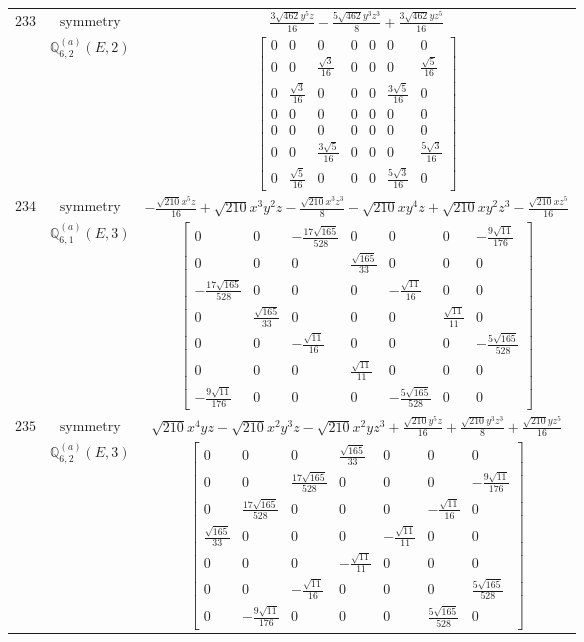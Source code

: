\documentclass[fleqn,8pt,landscape]{jsarticle}
\begin{document}
\begin{longtable}{ccc}
$ 233 $ & $ \text{symmetry} $ & $ \frac{3 \sqrt{462} y^{5} z}{16} - \frac{5 \sqrt{462} y^{3} z^{3}}{8} + \frac{3 \sqrt{462} y z^{5}}{16} $ \\
$  $ & $ \mathbb{Q}_{6,2}^{(a)}(E,2) $ & $ \begin{bmatrix} 0 & 0 & 0 & 0 & 0 & 0 & 0 \\ 0 & 0 & \frac{\sqrt{3}}{16} & 0 & 0 & 0 & \frac{\sqrt{5}}{16} \\ 0 & \frac{\sqrt{3}}{16} & 0 & 0 & 0 & \frac{3 \sqrt{5}}{16} & 0 \\ 0 & 0 & 0 & 0 & 0 & 0 & 0 \\ 0 & 0 & 0 & 0 & 0 & 0 & 0 \\ 0 & 0 & \frac{3 \sqrt{5}}{16} & 0 & 0 & 0 & \frac{5 \sqrt{3}}{16} \\ 0 & \frac{\sqrt{5}}{16} & 0 & 0 & 0 & \frac{5 \sqrt{3}}{16} & 0 \end{bmatrix} $ \\ \hline
$ 234 $ & $ \text{symmetry} $ & $ - \frac{\sqrt{210} x^{5} z}{16} + \sqrt{210} x^{3} y^{2} z - \frac{\sqrt{210} x^{3} z^{3}}{8} - \sqrt{210} x y^{4} z + \sqrt{210} x y^{2} z^{3} - \frac{\sqrt{210} x z^{5}}{16} $ \\
$  $ & $ \mathbb{Q}_{6,1}^{(a)}(E,3) $ & $ \begin{bmatrix} 0 & 0 & - \frac{17 \sqrt{165}}{528} & 0 & 0 & 0 & - \frac{9 \sqrt{11}}{176} \\ 0 & 0 & 0 & \frac{\sqrt{165}}{33} & 0 & 0 & 0 \\ - \frac{17 \sqrt{165}}{528} & 0 & 0 & 0 & - \frac{\sqrt{11}}{16} & 0 & 0 \\ 0 & \frac{\sqrt{165}}{33} & 0 & 0 & 0 & \frac{\sqrt{11}}{11} & 0 \\ 0 & 0 & - \frac{\sqrt{11}}{16} & 0 & 0 & 0 & - \frac{5 \sqrt{165}}{528} \\ 0 & 0 & 0 & \frac{\sqrt{11}}{11} & 0 & 0 & 0 \\ - \frac{9 \sqrt{11}}{176} & 0 & 0 & 0 & - \frac{5 \sqrt{165}}{528} & 0 & 0 \end{bmatrix} $ \\ \hline
$ 235 $ & $ \text{symmetry} $ & $ \sqrt{210} x^{4} y z - \sqrt{210} x^{2} y^{3} z - \sqrt{210} x^{2} y z^{3} + \frac{\sqrt{210} y^{5} z}{16} + \frac{\sqrt{210} y^{3} z^{3}}{8} + \frac{\sqrt{210} y z^{5}}{16} $ \\
$  $ & $ \mathbb{Q}_{6,2}^{(a)}(E,3) $ & $ \begin{bmatrix} 0 & 0 & 0 & \frac{\sqrt{165}}{33} & 0 & 0 & 0 \\ 0 & 0 & \frac{17 \sqrt{165}}{528} & 0 & 0 & 0 & - \frac{9 \sqrt{11}}{176} \\ 0 & \frac{17 \sqrt{165}}{528} & 0 & 0 & 0 & - \frac{\sqrt{11}}{16} & 0 \\ \frac{\sqrt{165}}{33} & 0 & 0 & 0 & - \frac{\sqrt{11}}{11} & 0 & 0 \\ 0 & 0 & 0 & - \frac{\sqrt{11}}{11} & 0 & 0 & 0 \\ 0 & 0 & - \frac{\sqrt{11}}{16} & 0 & 0 & 0 & \frac{5 \sqrt{165}}{528} \\ 0 & - \frac{9 \sqrt{11}}{176} & 0 & 0 & 0 & \frac{5 \sqrt{165}}{528} & 0 \end{bmatrix} $ \\ \hline

\end{longtable}
\end{document}

